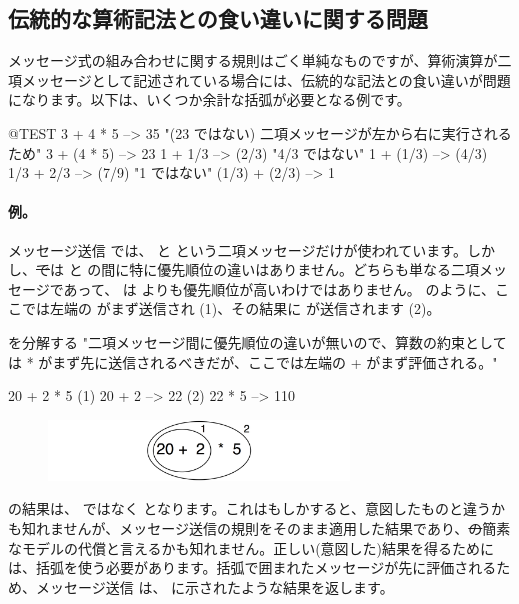 \documentclass[a4paper,10pt,twoside]{book}
\begin{document}
\subsection{伝統的な算術記法との食い違いに関する問題}
メッセージ式の組み合わせに関する規則はごく単純なものですが、算術演算が二項メッセージとして記述されている場合には、伝統的な記法との食い違いが問題になります。以下は、いくつか余計な括弧が必要となる例です。

\begin{code}{@TEST}
3 + 4 * 5      --> 35    "(23 ではない)  二項メッセージが左から右に実行されるため"
3 + (4 * 5)    --> 23
1 + 1/3         --> (2/3)    "4/3 ではない"
1 + (1/3)       --> (4/3)
1/3 + 2/3       --> (7/9)    "1 ではない"
(1/3) + (2/3)  --> 1
\end{code}

\paragraph{例。}
メッセージ送信  では、\ct{+} と \ct{*} という二項メッセージだけが使われています。しかし、\st では \ct{+} と \ct{*} の間に特に優先順位の違いはありません。どちらも単なる二項メッセージであって、\ct{*} は \ct{+} よりも優先順位が高いわけではありません。 のように、ここでは左端の \ct{+} がまず送信され (1)、その結果に \ct{*} が送信されます (2)。

\begin{example}[binaryMessages1]{ を分解する}{}
"二項メッセージ間に優先順位の違いが無いので、算数の約束としては * がまず先に送信されるべきだが、ここでは左端の + がまず評価される。"

      20 + 2 * 5 
(1)  20 + 2 --> 22
(2)  22       * 5 --> 110
\end{example}

\begin{figure}
\begin{center}\includegraphics[width=8cm]{ucompoNoBracketPar}\end{center}
\end{figure}
\noindent
{}の結果は、 ではなく  となります。これはもしかすると、意図したものと違うかも知れませんが、メッセージ送信の規則をそのまま適用した結果であり、\st の簡素なモデルの代償と言えるかも知れません。正しい(意図した)結果を得るためには、括弧を使う必要があります。括弧で囲まれたメッセージが先に評価されるため、メッセージ送信  は、 に示されたような結果を返します。
\end{document}
